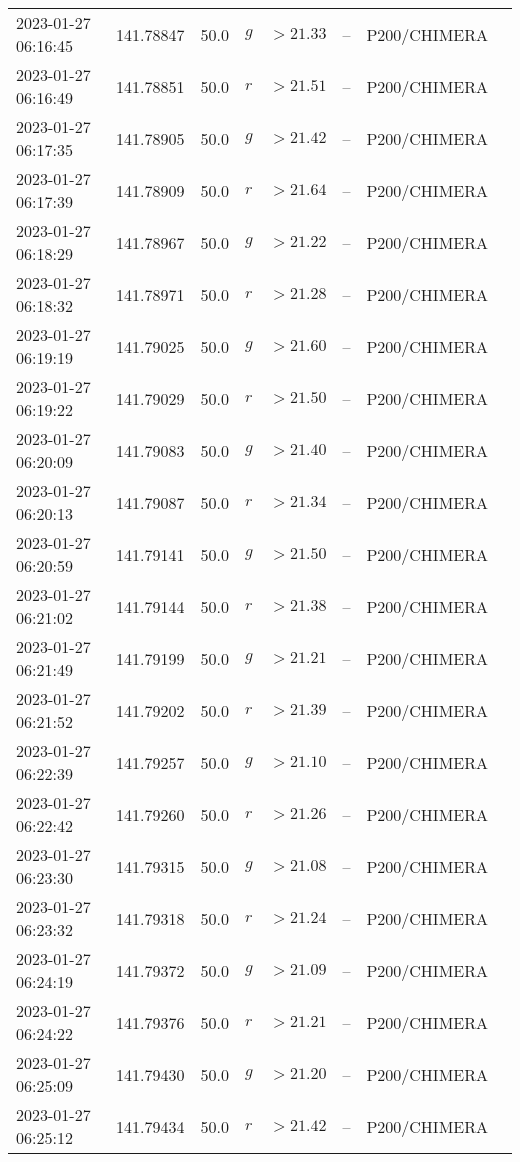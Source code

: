 \documentclass{nature_plusfigure}
\begin{document}
\begin{supplement}
\begin{center}
\begin{longtable}{llllllll}
2023-01-27 06:16:45 & 141.78847 & 50.0 & $g$ & $>21.33$ & -- & P200/CHIMERA &  \\ 
2023-01-27 06:16:49 & 141.78851 & 50.0 & $r$ & $>21.51$ & -- & P200/CHIMERA &  \\ 
2023-01-27 06:17:35 & 141.78905 & 50.0 & $g$ & $>21.42$ & -- & P200/CHIMERA &  \\ 
2023-01-27 06:17:39 & 141.78909 & 50.0 & $r$ & $>21.64$ & -- & P200/CHIMERA &  \\ 
2023-01-27 06:18:29 & 141.78967 & 50.0 & $g$ & $>21.22$ & -- & P200/CHIMERA &  \\ 
2023-01-27 06:18:32 & 141.78971 & 50.0 & $r$ & $>21.28$ & -- & P200/CHIMERA &  \\ 
2023-01-27 06:19:19 & 141.79025 & 50.0 & $g$ & $>21.60$ & -- & P200/CHIMERA &  \\ 
2023-01-27 06:19:22 & 141.79029 & 50.0 & $r$ & $>21.50$ & -- & P200/CHIMERA &  \\ 
2023-01-27 06:20:09 & 141.79083 & 50.0 & $g$ & $>21.40$ & -- & P200/CHIMERA &  \\ 
2023-01-27 06:20:13 & 141.79087 & 50.0 & $r$ & $>21.34$ & -- & P200/CHIMERA &  \\ 
2023-01-27 06:20:59 & 141.79141 & 50.0 & $g$ & $>21.50$ & -- & P200/CHIMERA &  \\ 
2023-01-27 06:21:02 & 141.79144 & 50.0 & $r$ & $>21.38$ & -- & P200/CHIMERA &  \\ 
2023-01-27 06:21:49 & 141.79199 & 50.0 & $g$ & $>21.21$ & -- & P200/CHIMERA &  \\ 
2023-01-27 06:21:52 & 141.79202 & 50.0 & $r$ & $>21.39$ & -- & P200/CHIMERA &  \\ 
2023-01-27 06:22:39 & 141.79257 & 50.0 & $g$ & $>21.10$ & -- & P200/CHIMERA &  \\ 
2023-01-27 06:22:42 & 141.79260 & 50.0 & $r$ & $>21.26$ & -- & P200/CHIMERA &  \\ 
2023-01-27 06:23:30 & 141.79315 & 50.0 & $g$ & $>21.08$ & -- & P200/CHIMERA &  \\ 
2023-01-27 06:23:32 & 141.79318 & 50.0 & $r$ & $>21.24$ & -- & P200/CHIMERA &  \\ 
2023-01-27 06:24:19 & 141.79372 & 50.0 & $g$ & $>21.09$ & -- & P200/CHIMERA &  \\ 
2023-01-27 06:24:22 & 141.79376 & 50.0 & $r$ & $>21.21$ & -- & P200/CHIMERA &  \\ 
2023-01-27 06:25:09 & 141.79430 & 50.0 & $g$ & $>21.20$ & -- & P200/CHIMERA &  \\ 
2023-01-27 06:25:12 & 141.79434 & 50.0 & $r$ & $>21.42$ & -- & P200/CHIMERA &  \\ 

\end{longtable}
\end{center}
\end{supplement}
\end{document}
